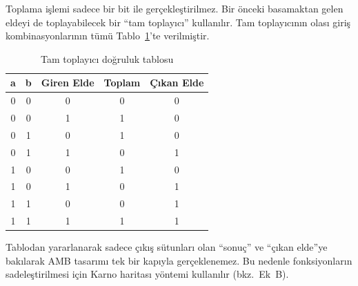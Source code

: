 Toplama işlemi sadece bir bit ile gerçekleştirilmez. Bir önceki basamaktan gelen eldeyi de toplayabilecek bir ``tam toplayıcı'' kullanılır. Tam toplayıcının olası giriş kombinasyonlarının tümü Tablo~\ref{tab:tam-toplayici}'te verilmiştir.

\begin{table}[htbp]
\centering
\caption{Tam toplayıcı doğruluk tablosu}
\label{tab:tam-toplayici}
\begin{tabular}{c c c | c c}
\toprule
\textbf{a} & \textbf{b} & \textbf{Giren Elde} & \textbf{Toplam} & \textbf{Çıkan Elde} \\
\midrule
0 & 0 & 0 & 0 & 0 \\
0 & 0 & 1 & 1 & 0 \\
0 & 1 & 0 & 1 & 0 \\
0 & 1 & 1 & 0 & 1 \\
1 & 0 & 0 & 1 & 0 \\
1 & 0 & 1 & 0 & 1 \\
1 & 1 & 0 & 0 & 1 \\
1 & 1 & 1 & 1 & 1 \\
\bottomrule
\end{tabular}
\end{table}

Tablodan yararlanarak sadece çıkış sütunları olan ``sonuç'' ve ``çıkan elde''ye bakılarak AMB tasarımı tek bir kapıyla gerçeklenemez. Bu nedenle fonksiyonların sadeleştirilmesi için Karno haritası yöntemi kullanılır (bkz.\ Ek~B).


